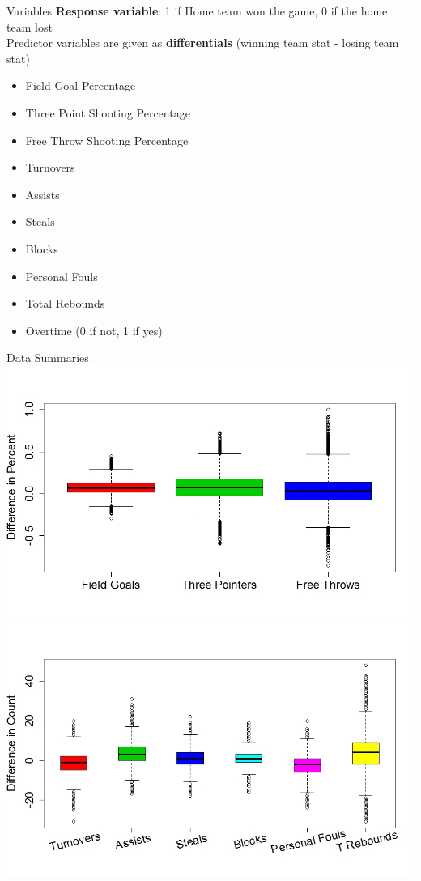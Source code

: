 \documentclass{beamer}
\begin{document}
\begin{frame}{Variables}
\textbf{Response variable}: 1 if Home team won the game, 0 if the home team lost\\
Predictor variables are given as \textbf{differentials} (winning team stat - losing team stat) 

	\begin{multicols}{2}
		
	\begin{itemize}
		\item Field Goal Percentage
		\item Three Point Shooting Percentage
		\item Free Throw Shooting Percentage
		\item Turnovers
		\item Assists
		\item Steals
		\item Blocks
		\item Personal Fouls
		\item Total Rebounds
		\item Overtime (0 if not, 1 if yes)
	\end{itemize}
	
\end{multicols}


\end{frame}

\begin{frame}{Data Summaries}
	\centering
	\includegraphics[height=.45\textheight]{percentbox.jpeg}\\
	\vspace{-15pt}
	\includegraphics[height=.5\textheight]{diffbox.jpeg}
\end{frame}
\end{document}
